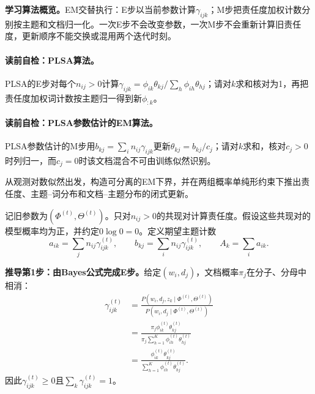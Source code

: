 \label{struct:V4-C06-CH10}
\textbf{学习算法概览。}EM交替执行：E步以当前参数计算$\gamma_{ijk}$；M步把责任度加权计数分别按主题和文档归一化。一次E步不会改变参数，一次M步不会重新计算旧责任度，更新顺序不能交换或混用两个迭代时刻。

\paragraph{读前自检：PLSA算法。}PLSA的E步对每个$n_{ij}>0$计算$\gamma_{ijk}=\phi_{ik}\theta_{kj}/\sum_h\phi_{ih}\theta_{hj}$；请对$k$求和核对为1，再把责任度加权词计数按主题归一得到新$\phi_{:k}$。\par
\paragraph{读前自检：PLSA参数估计的EM算法。}PLSA参数估计的M步用$b_{kj}=\sum_i n_{ij}\gamma_{ijk}$更新$\theta_{kj}=b_{kj}/c_j$；请对$k$求和，核对$c_j>0$时列归一，而$c_j=0$时该文档混合不可由训练似然识别。\par


\label{struct:V4-C06-CH11}

\begin{derivationgoalbox}
从观测对数似然出发，构造可分离的EM下界，并在两组概率单纯形约束下推出责任度、主题--词分布和文档--主题分布的闭式更新。
\end{derivationgoalbox}
\begin{derivationprepbox}
记旧参数为$(\Phi^{(t)},\Theta^{(t)})$。只对$n_{ij}>0$的共现对计算责任度。假设这些共现对的模型概率均为正，并约定$0\log0=0$。定义期望主题计数
\[
a_{ik}=\sum_j n_{ij}\gamma_{ijk}^{(t)},\qquad
b_{kj}=\sum_i n_{ij}\gamma_{ijk}^{(t)},\qquad
A_k=\sum_i a_{ik}.
\]
\end{derivationprepbox}
\textbf{推导第1步：由Bayes公式完成E步。}给定$(w_i,d_j)$，文档概率$\pi_j$在分子、分母中相消：
\[
\begin{aligned}
\gamma_{ijk}^{(t)}
&=\frac{P(w_i,d_j,z_k\mid\Phi^{(t)},\Theta^{(t)})}
{P(w_i,d_j\mid\Phi^{(t)},\Theta^{(t)})}\\
&=\frac{\pi_j\phi_{ik}^{(t)}\theta_{kj}^{(t)}}
{\pi_j\sum_{h=1}^K\phi_{ih}^{(t)}\theta_{hj}^{(t)}}\\
&=\frac{\phi_{ik}^{(t)}\theta_{kj}^{(t)}}
{\sum_{h=1}^K\phi_{ih}^{(t)}\theta_{hj}^{(t)}}.
\end{aligned}
\]
因此$\gamma_{ijk}^{(t)}\ge0$且$\sum_k\gamma_{ijk}^{(t)}=1$。

